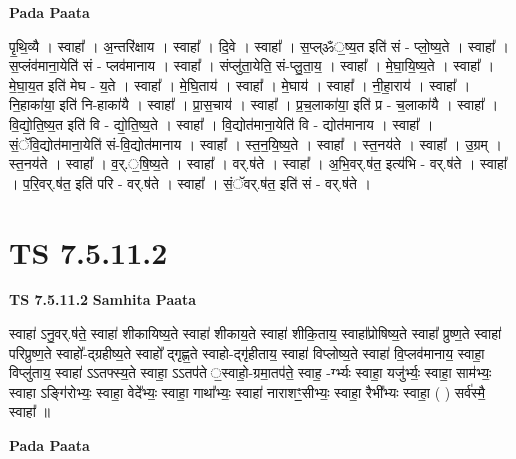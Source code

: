 \documentclass[17pt]{extarticle}
\begin{document}
\textbf{Pada Paata} \newline

पृ॒थि॒व्यै । स्वाहा᳚ । अ॒न्तरि॑क्षाय । स्वाहा᳚ । दि॒वे । स्वाहा᳚ । स॒प्ल्ॐ॒ष्य॒त इति॑ सं - प्लो॒ष्य॒ते । स्वाहा᳚ । स॒प्लंव॑माना॒येति॑ सं - प्लव॑मानाय । स्वाहा᳚ । संप्लु॑ता॒येति॒ सं-प्लु॒ता॒य॒ । स्वाहा᳚ । मे॒घा॒यि॒ष्य॒ते । स्वाहा᳚ । मे॒घा॒य॒त इति॑ मेघ - य॒ते । स्वाहा᳚ । मे॒घि॒ताय॑ । स्वाहा᳚ । मे॒घाय॑ । स्वाहा᳚ । नी॒हा॒राय॑ । स्वाहा᳚ । नि॒हाका॑या॒ इति॑ नि-हाका॑यै । स्वाहा᳚ । प्रा॒स॒चाय॑ । स्वाहा᳚ । प्र॒च॒लाका॑या॒ इति॑ प्र - च॒लाका॑यै । स्वाहा᳚ । वि॒द्यो॒ति॒ष्य॒त इति॑ वि - द्यो॒ति॒ष्य॒ते । स्वाहा᳚ । वि॒द्योत॑माना॒येति॑ वि - द्योत॑मानाय । स्वाहा᳚ । सं॒ॅवि॒द्योत॑माना॒येति॑ सं-वि॒द्योत॑मानाय । स्वाहा᳚ । स्त॒न॒यि॒ष्य॒ते । स्वाहा᳚ । स्त॒नय॑ते । स्वाहा᳚ । उ॒ग्रम् । स्त॒नय॑ते । स्वाहा᳚ । व॒र्.॒षि॒ष्य॒ते । स्वाहा᳚ । वर्.ष॑ते । स्वाहा᳚ । अ॒भि॒वर्.ष॑त॒ इत्य॑भि - वर्.ष॑ते । स्वाहा᳚ । प॒रि॒वर्.ष॑त॒ इति॑ परि - वर्.ष॑ते । स्वाहा᳚ । सं॒ॅवर्.ष॑त॒ इति॑ सं - वर्.ष॑ते ।  \newline




\section*{ TS 7.5.11.2 }

\textbf{TS 7.5.11.2 } \newline
\textbf{Samhita Paata} \newline

स्वाहा॑ ऽनु॒वर्.ष॑ते॒ स्वाहा॑ शीकायिष्य॒ते स्वाहा॑ शीकाय॒ते स्वाहा॑ शीकि॒ताय॒ स्वाहा᳚प्रोषिष्य॒ते स्वाहा᳚ प्रुष्ण॒ते स्वाहा॑ परिप्रुष्ण॒ते स्वाहो᳚-द्ग्रहीष्य॒ते स्वाहो᳚ द्गृह्ण॒ते स्वाहो-द्गृ॑हीताय॒ स्वाहा॑ विप्लोष्य॒ते स्वाहा॑ वि॒प्लव॑मानाय॒ स्वाहा॒ विप्लु॑ताय॒ स्वाहा॑ ऽऽतफ्स्य॒ते स्वाहा॒ ऽऽतप॑ते ॒स्वाहो॒-ग्रमा॒तप॑ते॒ स्वाह॒ -र्ग्भ्यः स्वाहा॒ यजु॑र्भ्यः॒ स्वाहा॒ साम॑भ्यः॒ स्वाहा ऽङ्गि॑रोभ्यः॒ स्वाहा॒ वेदे᳚भ्यः॒ स्वाहा॒ गाथा᳚भ्यः॒ स्वाहा॑ नाराशꣳ॒॒सीभ्यः॒ स्वाहा॒ रैभी᳚भ्यः स्वाहा॒ ( ) सर्व॑स्मै॒ स्वाहा᳚ ॥ \newline

\textbf{Pada Paata} \newline
\end{document}
